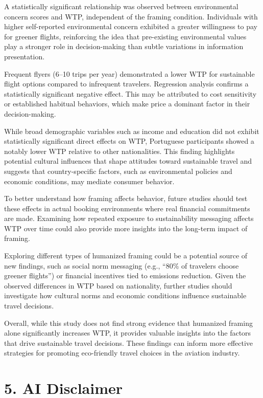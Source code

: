 \documentclass[
]{article}
\begin{document}
A statistically significant relationship was observed between
environmental concern scores and WTP, independent of the framing
condition. Individuals with higher self-reported environmental concern
exhibited a greater willingness to pay for greener flights, reinforcing
the idea that pre-existing environmental values play a stronger role in
decision-making than subtle variations in information presentation.

Frequent flyers (6--10 trips per year) demonstrated a lower WTP for
sustainable flight options compared to infrequent travelers. Regression
analysis confirms a statistically significant negative effect. This may
be attributed to cost sensitivity or established habitual behaviors,
which make price a dominant factor in their decision-making.

While broad demographic variables such as income and education did not
exhibit statistically significant direct effects on WTP, Portuguese
participants showed a notably lower WTP relative to other nationalities.
This finding highlights potential cultural influences that shape
attitudes toward sustainable travel and suggests that country-specific
factors, such as environmental policies and economic conditions, may
mediate consumer behavior.

To better understand how framing affects behavior, future studies should
test these effects in actual booking environments where real financial
commitments are made. Examining how repeated exposure to sustainability
messaging affects WTP over time could also provide more insights into
the long-term impact of framing.

Exploring different types of humanized framing could be a potential
source of new findings, such as social norm messaging (e.g., ``80\% of
travelers choose greener flights'') or financial incentives tied to
emissions reduction. Given the observed differences in WTP based on
nationality, further studies should investigate how cultural norms and
economic conditions influence sustainable travel decisions.

Overall, while this study does not find strong evidence that humanized
framing alone significantly increases WTP, it provides valuable insights
into the factors that drive sustainable travel decisions. These findings
can inform more effective strategies for promoting eco-friendly travel
choices in the aviation industry.

\hypertarget{ai-disclaimer}{%
\section{5. AI Disclaimer}\label{ai-disclaimer}}
\end{document}

